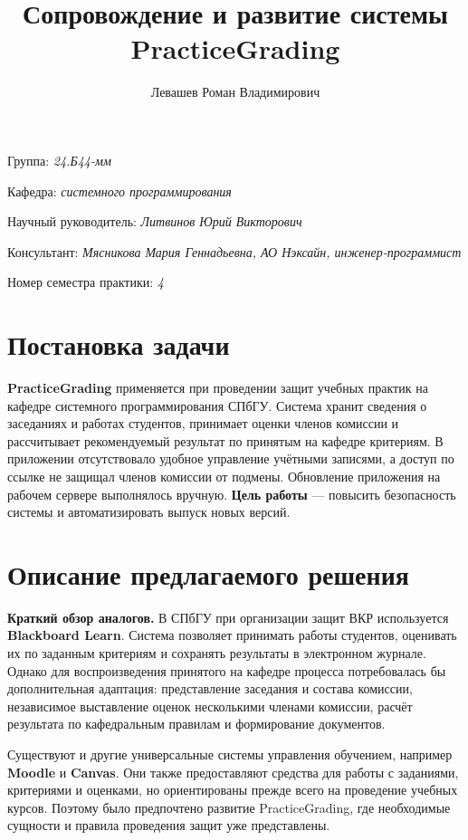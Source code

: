 \documentclass[a4paper]{article}
\title{Сопровождение и развитие системы PracticeGrading}
\author{Левашев Роман Владимирович}
\date{}
\begin{document}
\setlength{\emergencystretch}{2em}

\maketitle

\begin{flushright}
    Группа: \emph{24.Б44-мм}

    Кафедра: \emph{системного программирования}

    Научный руководитель: \emph{Литвинов Юрий Викторович}

    Консультант: \emph{Мясникова Мария Геннадьевна, АО Нэксайн, инженер-программист}

    Номер семестра практики: \emph{4}
\end{flushright}


\section{Постановка задачи}

\textbf{PracticeGrading} применяется при проведении защит учебных практик на
кафедре системного программирования СПбГУ. Система хранит сведения о заседаниях
и работах студентов, принимает оценки членов комиссии и рассчитывает
рекомендуемый результат по принятым на кафедре критериям. В приложении
отсутствовало удобное управление учётными записями, а доступ по ссылке не
защищал членов комиссии от подмены. Обновление приложения на рабочем сервере
выполнялось вручную. \textbf{Цель работы} --- повысить безопасность системы и
автоматизировать выпуск новых версий.


\section{Описание предлагаемого решения}

\textbf{Краткий обзор аналогов.} В СПбГУ при организации защит ВКР
используется \textbf{Blackboard Learn}. Система позволяет принимать работы
студентов, оценивать их по заданным критериям и сохранять результаты в
электронном журнале. Однако для воспроизведения принятого на кафедре процесса
потребовалась бы дополнительная адаптация: представление заседания и состава
комиссии, независимое выставление оценок несколькими членами комиссии, расчёт
результата по кафедральным правилам и формирование документов.

Существуют и другие универсальные системы управления обучением, например
\textbf{Moodle} и \textbf{Canvas}. Они также предоставляют средства для работы
с заданиями, критериями и оценками, но ориентированы прежде всего на проведение
учебных курсов. Поэтому было предпочтено развитие PracticeGrading, где
необходимые сущности и правила проведения защит уже представлены.
\end{document}
